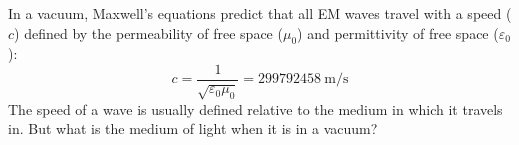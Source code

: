 In a vacuum, Maxwell's equations predict that all EM waves travel with a speed
($c$) defined by the permeability of free space ($\mu_0$) and permittivity of
free space ($\varepsilon_0$):
\begin{equation}
  \boxed{
    c=\frac1{\sqrt{\varepsilon_0\mu_0}}=\SI{299792458}{\metre\per\second}
  }
\end{equation}
The speed of a wave is usually defined relative to the medium in which it
travels in. But what is the medium of light when it is in a vacuum?
%
%
%
%
%
%
%
%
%


